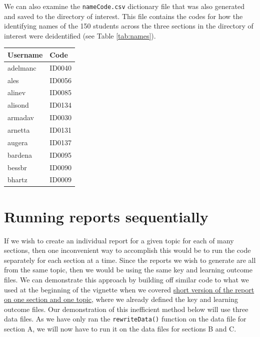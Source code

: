 \documentclass{article}\usepackage[]{graphicx}\usepackage[]{color}
\numberwithin{equation}{section} %
\begin{document}
We can also examine the \texttt{nameCode.csv} dictionary file that was also generated and saved to the directory of interest. This file contains the codes for how the identifying names of the 150 students across the three sections in the directory of interest were deidentified (see Table \ref{tab:names}).

\begin{center}
\label{tab:names}
\begin{tabular} { | l | l |}
\hline \textbf{Username} & \textbf{Code} \\
\hline
adelmanc & ID0040 \\
\hline
ales & ID0056 \\
\hline
alinev & ID0085 \\
\hline
alisond & ID0134 \\
\hline
armadav & ID0030 \\
\hline
arnetta & ID0131 \\
\hline
augera & ID0137 \\
\hline
bardena & ID0095 \\
\hline
bessbr & ID0090 \\
\hline
bhartz & ID0009 \\
\hline
\end{tabular}
\end{center}

\section{Running reports sequentially}
\label{sec:sequential}

If we wish to create an individual report for a given topic for each of many sections, then one inconvenient way to accomplish this would be to run the code separately for each section at a time. Since the reports we wish to generate are all from the same topic, then we would be using the same key and learning outcome files. We can demonstrate this approach by building off similar code to what we used at the beginning of the vignette when we covered \hyperref[sec:codeOnce]{short version of the report on one section and one topic}, where we already defined the key and learning outcome files. Our demonstration of this inefficient method below will use three data files. As we have only ran the \texttt{rewriteData()} function on the data file for section A, we will now have to run it on the data files for sections B and C.
\end{document}
